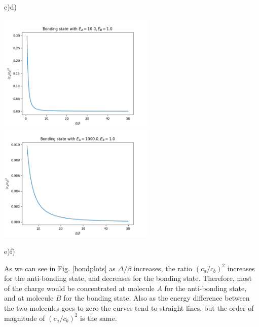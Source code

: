 \begin{questions}
\begin{solution}
\hspace{3.6cm}c)\hspace{7.5cm}d)

\includegraphics[width=75mm]{bond-10-mal.png}
\includegraphics[width=75mm]{bond-1000-mal.png}\label{bondplots}

\hspace{3.6cm}e)\hspace{7.5cm}f)


 As we can see in Fig. \ref{bondplots} as $\Delta/\beta$ increases, the ratio $(c_a/c_b)^2$ increases for the anti-bonding state, and decreases for the bonding state. Therefore, most of the charge would be concentrated at molecule $A$ for the anti-bonding state, and at molecule $B$ for the bonding state. Also as the energy difference between the two molecules goes to zero the curves tend to straight lines, but the order of magnitude of $(c_a/c_b)^2$ is the same.
\end{solution}
\end{questions}
